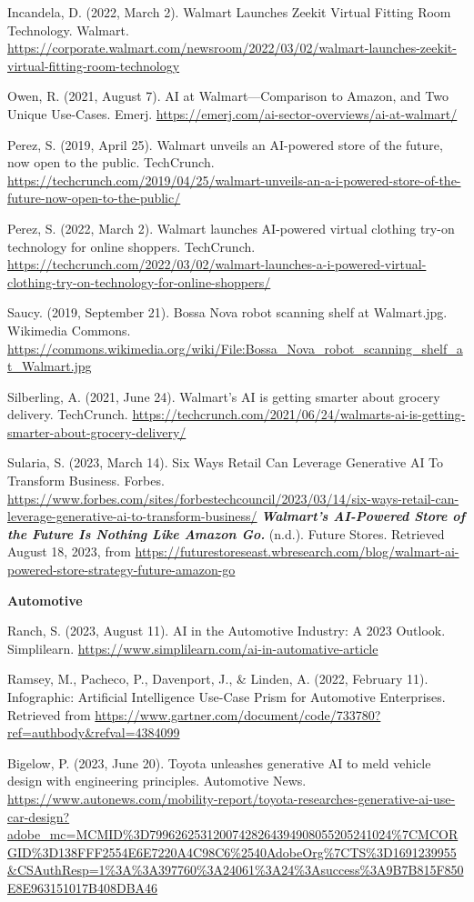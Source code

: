 \documentclass[
]{article}
\begin{document}
Incandela, D. (2022, March 2). Walmart Launches Zeekit Virtual Fitting Room Technology. Walmart. \url{https://corporate.walmart.com/newsroom/2022/03/02/walmart-launches-zeekit-virtual-fitting-room-technology}

Owen, R. (2021, August 7). AI at Walmart---Comparison to Amazon, and Two Unique Use-Cases. Emerj. \url{https://emerj.com/ai-sector-overviews/ai-at-walmart/}

Perez, S. (2019, April 25). Walmart unveils an AI-powered store of the future, now open to the public. TechCrunch. \url{https://techcrunch.com/2019/04/25/walmart-unveils-an-a-i-powered-store-of-the-future-now-open-to-the-public/}

Perez, S. (2022, March 2). Walmart launches AI-powered virtual clothing try-on technology for online shoppers. TechCrunch. \url{https://techcrunch.com/2022/03/02/walmart-launches-a-i-powered-virtual-clothing-try-on-technology-for-online-shoppers/}

Saucy. (2019, September 21). Bossa Nova robot scanning shelf at Walmart.jpg. Wikimedia Commons. \url{https://commons.wikimedia.org/wiki/File:Bossa_Nova_robot_scanning_shelf_at_Walmart.jpg}

Silberling, A. (2021, June 24). Walmart's AI is getting smarter about grocery delivery. TechCrunch. \url{https://techcrunch.com/2021/06/24/walmarts-ai-is-getting-smarter-about-grocery-delivery/}

Sularia, S. (2023, March 14). Six Ways Retail Can Leverage Generative AI To Transform Business. Forbes. \url{https://www.forbes.com/sites/forbestechcouncil/2023/03/14/six-ways-retail-can-leverage-generative-ai-to-transform-business/}
\textbf{\emph{Walmart's AI-Powered Store of the Future Is Nothing Like Amazon Go.}} (n.d.). Future Stores. Retrieved August 18, 2023, from \url{https://futurestoreseast.wbresearch.com/blog/walmart-ai-powered-store-strategy-future-amazon-go}

\textbf{Automotive}

Ranch, S. (2023, August 11). AI in the Automotive Industry: A 2023 Outlook. Simplilearn. \url{https://www.simplilearn.com/ai-in-automative-article}

Ramsey, M., Pacheco, P., Davenport, J., \& Linden, A. (2022, February 11). Infographic: Artificial Intelligence Use-Case Prism for Automotive Enterprises. Retrieved from \url{https://www.gartner.com/document/code/733780?ref=authbody\&refval=4384099}

Bigelow, P. (2023, June 20). Toyota unleashes generative AI to meld vehicle design with engineering principles. Automotive News. \url{https://www.autonews.com/mobility-report/toyota-researches-generative-ai-use-car-design?adobe_mc=MCMID\%3D79962625312007428264394908055205241024\%7CMCORGID\%3D138FFF2554E6E7220A4C98C6\%2540AdobeOrg\%7CTS\%3D1691239955\&CSAuthResp=1\%3A\%3A397760\%3A24061\%3A24\%3Asuccess\%3A9B7B815F850E8E963151017B408DBA46}
\end{document}
